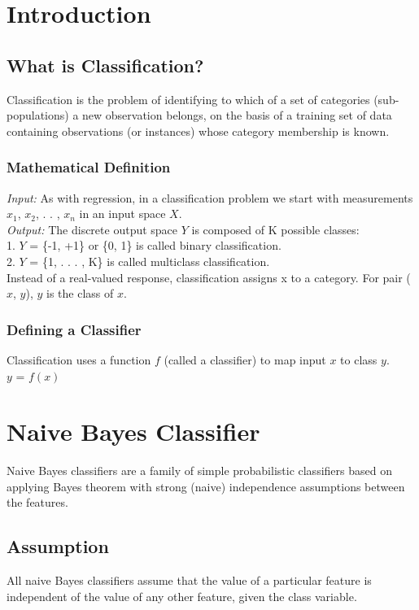 
\section{Introduction}
\subsection{What is Classification?}

Classification is the problem of identifying to which of a set of categories (sub-populations) a new observation belongs, on the basis of a training set of data containing observations (or instances) whose category membership is known.

\subsubsection{Mathematical Definition}
{\itshape Input:} As with regression, in a classification problem we start with measurements {$x_1$, $x_2$, . . , $x_n$} in an input space $X$.
\\{\itshape Output:} The discrete output space $Y$ is composed of K possible classes:\\
1. $Y$ = \{-1, +1\} or \{0, 1\} is called binary classification.\\
2. $Y$ = \{1, . . . , K\} is called multiclass classification.\\
Instead of a real-valued response, classification assigns x to a category. For pair ($x$, $y$), $y$ is the class of $x$.

\subsubsection{Defining a Classifier}
Classification uses a function $f$ (called a classifier) to map input $x$ to class $y$.\\

    $y$ = $f(x)$

\section{Naive Bayes Classifier}
Naive Bayes classifiers are a family of simple probabilistic classifiers based on applying Bayes theorem with strong (naive) independence assumptions between the features.
\subsection{Assumption} All naive Bayes classifiers assume that the value of a particular feature is independent of the value of any other feature, given the class variable.

